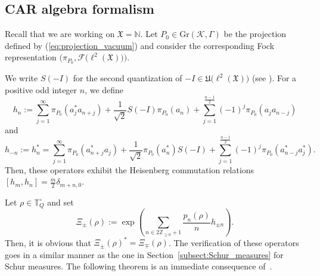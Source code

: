 \documentclass[pdftex]{sigma}
\numberwithin{equation}{section}
\newcommand{\mfrak}[1]{\mathfrak{#1}}
\newcommand{\mcal}[1]{\mathcal{#1}}
\newcommand{\mbb}[1]{\mathbb{#1}}
\newcommand{\mrm}[1]{\mathrm{#1}}
\begin{document}
\subsection{CAR algebra formalism}
Recall that we are working on $\mfrak{X}=\mbb{N}$. Let $P_{0}\in \mrm{Gr}(\mcal{K},\Gamma)$ be the projection defined by (\ref{eq:projection_vacuum}) and consider the corresponding Fock representation $\big(\pi_{P_{0}},\mcal{F}\big(\ell^{2}(\mfrak{X})\big)\big)$.

We write $S(-I)$ for the second quantization of $-I\in\mfrak{U}\big(\ell^{2}(\mfrak{X})\big)$ (see \cite[Section~5.2.1]{BratteliRobinson1997}).
For a positive odd integer $n$, we define
\begin{equation*}
h_{n}:=\sum_{j=1}^{\infty}\pi_{P_{0}}(a_{j}^{\ast}a_{n+j})+\frac{1}{\sqrt{2}}S(-I)\pi_{P_{0}}(a_{n})+\sum_{j=1}^{\frac{n-1}{2}}(-1)^{j}\pi_{P_{0}}(a_{j}a_{n-j})
\end{equation*}
and
\begin{equation*}
h_{-n}:=h_{n}^{\ast}=\sum_{j=1}^{\infty}\pi_{P_{0}}(a^{\ast}_{n+j}a_{j})+\frac{1}{\sqrt{2}}\pi_{P_{0}}(a_{n}^{\ast})S(-I)+\sum_{j=1}^{\frac{n-1}{2}}(-1)^{j}\pi_{P_{0}}(a^{\ast}_{n-j}a^{\ast}_{j}).
\end{equation*}
Then, these operators exhibit the Heisenberg commutation relations $[h_{m},h_{n}]=\frac{m}{2}\delta_{m+n,0}$.

Let $\rho\in\mbb{T}_{Q}^{\circ}$ and set
\begin{equation*}
	\Xi_{\pm}(\rho):=\exp\left(\sum_{n\in 2\mbb{Z}_{\ge 0}+1}\frac{p_{n}(\rho)}{n}h_{\pm n}\right).
\end{equation*}
Then, it is obvious that $\Xi_{\pm}(\rho)^{\ast}=\Xi_{\mp}(\rho)$.
The verification of these operators goes in a similar manner as the one in Section~\ref{subsect:Schur_measures} for Schur measures.
The following theorem is an immediate consequence of~\cite{Matsumoto2005}.
\end{document}
